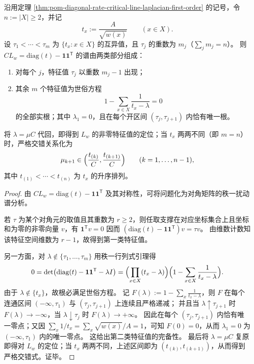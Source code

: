 

\begin{theorem}[临界非零谱的世俗方程与序统计交错]\label{thm:pom-diagonal-rate-critical-spectrum-secular-interlacing}
沿用定理 \ref{thm:pom-diagonal-rate-critical-line-laplacian-first-order} 的记号，令 \(n:=|X|\ge 2\)，并记
\[
t_x:=\frac{A}{\sqrt{w(x)}}\qquad(x\in X).
\]
设 \(\tau_1<\cdots<\tau_m\) 为 \(\{t_x:x\in X\}\) 的互异值，且 \(\tau_j\) 的重数为 \(m_j\)（\(\sum_j m_j=n\)）。
则 \(CL_w=\mathrm{diag}(t)-\mathbf 1\mathbf 1^{\mathsf T}\) 的谱由两类部分组成：
\begin{enumerate}
  \item 对每个 \(j\)，特征值 \(\tau_j\) 以重数 \(m_j-1\) 出现；
  \item 其余 \(m\) 个特征值为世俗方程
  \[
  1-\sum_{x\in X}\frac{1}{t_x-\lambda}=0
  \]
  的全部实根；其中 \(\lambda_1=0\)，且在每个开区间 \((\tau_j,\tau_{j+1})\) 内恰有唯一根。
\end{enumerate}
将 \(\lambda=\mu C\) 代回，即得到 \(L_w\) 的非零特征值的定位；当 \(t_x\) 两两不同（即 \(m=n\)）时，严格交错关系化为
\[
\mu_{k+1}\in\Bigl(\frac{t_{(k)}}{C},\frac{t_{(k+1)}}{C}\Bigr)\qquad(k=1,\dots,n-1),
\]
其中 \(t_{(1)}<\cdots<t_{(n)}\) 为 \(t_x\) 的升序排列。
\end{theorem}
\begin{proof}
由 \(CL_w=\mathrm{diag}(t)-\mathbf 1\mathbf 1^{\mathsf T}\) 及其对称性，可将问题化为对角矩阵的秩一扰动谱分析。
\par
若 \(\tau\) 为某个对角元的取值且其重数为 \(r\ge 2\)，则任取支撑在对应坐标集合上且坐标和为零的非零向量 \(v\)，有 \(\mathbf 1^{\mathsf T}v=0\) 因而 \((\mathrm{diag}(t)-\mathbf 1\mathbf 1^{\mathsf T})v=\tau v\)。
由维数计数知该特征空间维数为 \(r-1\)，故得到第一类特征值。
\par
另一方面，对 \(\lambda\notin\{\tau_1,\dots,\tau_m\}\) 用秩一行列式引理得
\[
0=\det\bigl(\mathrm{diag}(t)-\mathbf 1\mathbf 1^{\mathsf T}-\lambda I\bigr)
=\Bigl(\prod_{x\in X}(t_x-\lambda)\Bigr)\Bigl(1-\sum_{x\in X}\frac{1}{t_x-\lambda}\Bigr).
\]
由于 \(\lambda\notin\{t_x\}\)，故根必满足世俗方程。
记 \(F(\lambda):=1-\sum_x\frac{1}{t_x-\lambda}\)，则 \(F\) 在每个连通区间 \((-\infty,\tau_1)\) 与 \((\tau_j,\tau_{j+1})\) 上连续且严格递减；
并且当 \(\lambda\uparrow\tau_{j+1}\) 时 \(F(\lambda)\to-\infty\)，当 \(\lambda\downarrow\tau_j\) 时 \(F(\lambda)\to+\infty\)。
因此在每个 \((\tau_j,\tau_{j+1})\) 内恰有唯一零点；又因
\(
\sum_x 1/t_x=\sum_x\sqrt{w(x)}/A=1
\)，可知 \(F(0)=0\)，从而 \(\lambda_1=0\) 为 \((-\infty,\tau_1)\) 内的唯一零点。
这给出第二类特征值的完备性。
最后将 \(\lambda=\mu C\) 复原即得对 \(L_w\) 的定位；当 \(t_x\) 两两不同，上述区间即为 \((t_{(k)},t_{(k+1)})\)，从而得到严格交错式。证毕。
\end{proof}

